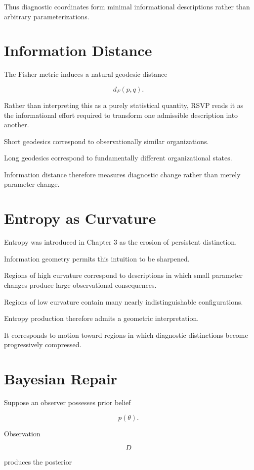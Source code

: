 \documentclass[11pt,oneside]{book}
\numberwithin{equation}{chapter}
\theoremstyle{definition}
\theoremstyle{plain}
\begin{document}
Thus diagnostic coordinates form minimal informational descriptions rather
than arbitrary parameterizations.

\section{Information Distance}

The Fisher metric induces a natural geodesic distance

\[
d_F(p,q).
\]

Rather than interpreting this as a purely statistical quantity, RSVP reads
it as the informational effort required to transform one admissible
description into another.

Short geodesics correspond to observationally similar organizations.

Long geodesics correspond to fundamentally different organizational states.

Information distance therefore measures diagnostic change rather than merely
parameter change.

\section{Entropy as Curvature}

Entropy was introduced in Chapter 3 as the erosion of persistent
distinction.

Information geometry permits this intuition to be sharpened.

Regions of high curvature correspond to descriptions in which small
parameter changes produce large observational consequences.

Regions of low curvature contain many nearly indistinguishable
configurations.

Entropy production therefore admits a geometric interpretation.

It corresponds to motion toward regions in which diagnostic distinctions
become progressively compressed.

\section{Bayesian Repair}

Suppose an observer possesses prior belief

\[
p(\theta).
\]

Observation

\[
D
\]

produces the posterior
\end{document}
